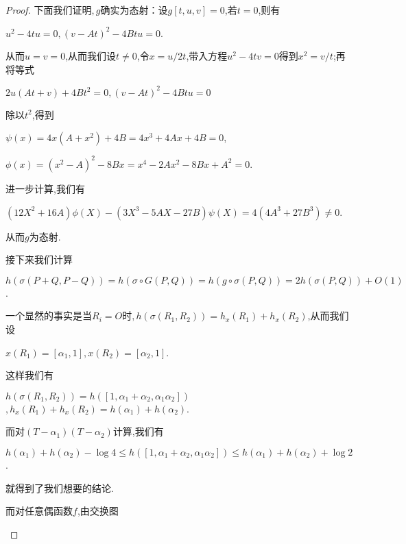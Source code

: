 \documentclass[11pt]{ctexart}
\DeclareMathOperator{\Log}{log}
\begin{document}
\begin{proof}
下面我们证明$,g$确实为态射：设$g[t,u,v]=0$,若$t=0$,则有
\begin{center}
    $u^2-4tu=0,(v-At)^2-4Btu=0$.
\end{center}
从而$u=v=0$,从而我们设$t\neq 0$,令$x=u/2t$,带入方程$u^2-4tv=0$得到$x^2=v/t$;再将等式
\begin{center}
    $2u(At+v)+4Bt^2=0$$,(v-At)^2-4Btu=0$
\end{center}
除以$t^2$,得到
\begin{center}
    $\psi(x)=4x(A+x^2)+4B=4x^3+4Ax+4B=0$,

    $\phi(x)=(x^2-A)^2-8Bx=x^4-2Ax^2-8Bx+A^2=0$.
\end{center}
进一步计算,我们有
\begin{center}
    $(12X^2+16A)\phi(X)-(3X^3-5AX-27B)\psi(X)=4(4A^3+27B^3)\neq 0$.
\end{center}
从而$g$为态射.

接下来我们计算
\begin{center}
    $h(\sigma(P+Q,P-Q))=h(\sigma \circ G(P,Q))=h(g\circ \sigma(P,Q) )=2h(\sigma(P,Q))+O(1)$.
\end{center}
一个显然的事实是当$R_i=O$时$,h(\sigma(R_1,R_2))=h_x(R_1)+h_x(R_2)$,从而我们设
\begin{center}
    $x(R_1)=[\alpha_1,1],x(R_2)=[\alpha_2,1]$.
\end{center}
这样我们有
\begin{center}
    $h(\sigma(R_1,R_2))=h([1,\alpha_1+\alpha_2,\alpha_1\alpha_2])$$,h_x(R_1)+h_x(R_2)=h(\alpha_1)+h(\alpha_2)$.
\end{center}
而对$(T-\alpha_1)(T-\alpha_2)$计算,我们有
\begin{center}
    $h(\alpha_1)+h(\alpha_2)-\Log4\leq h([1,\alpha_1+\alpha_2,\alpha_1\alpha_2]) \leq h(\alpha_1)+h(\alpha_2)+\Log2$.
\end{center}
就得到了我们想要的结论.

而对任意偶函数$f$,由交换图
\begin{center}
\end{center}
\end{proof}
\end{document}
